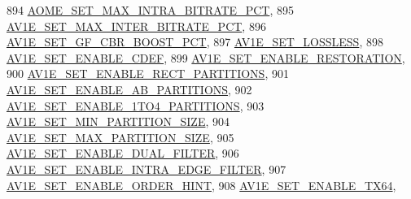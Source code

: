 \begin{DoxyCodeInclude}
{{{{{{{894                                         \hyperlink{group__aom__encoder_ggae78dde67a6d78f332e9bdba0dde42db5a9e1965ffa40d2d87556b65748c63adcc}{AOME\_SET\_MAX\_INTRA\_BITRATE\_PCT},
895                                         \hyperlink{group__aom__encoder_ggae78dde67a6d78f332e9bdba0dde42db5a54b7c950e51f39a3cb7344a2665b9929}{AV1E\_SET\_MAX\_INTER\_BITRATE\_PCT},
896                                         \hyperlink{group__aom__encoder_ggae78dde67a6d78f332e9bdba0dde42db5ade327180f01d27d22abd94c1f0a8bc9e}{AV1E\_SET\_GF\_CBR\_BOOST\_PCT},
897                                         \hyperlink{group__aom__encoder_ggae78dde67a6d78f332e9bdba0dde42db5afe875c6bb02f236be503c8c7b1f15875}{AV1E\_SET\_LOSSLESS},
898                                         \hyperlink{group__aom__encoder_ggae78dde67a6d78f332e9bdba0dde42db5a6879fe104e23de00f034ed11eb605031}{AV1E\_SET\_ENABLE\_CDEF},
899                                         \hyperlink{group__aom__encoder_ggae78dde67a6d78f332e9bdba0dde42db5a2ea70b4b379e701a4b3b7cc33eb05e65}{AV1E\_SET\_ENABLE\_RESTORATION},
900                                         \hyperlink{group__aom__encoder_ggae78dde67a6d78f332e9bdba0dde42db5af3db44e9871c69defc5ae2cc6c5e3ba0}{AV1E\_SET\_ENABLE\_RECT\_PARTITIONS},
901                                         \hyperlink{group__aom__encoder_ggae78dde67a6d78f332e9bdba0dde42db5a3f494511b35631e4d400f4df9a48c6dc}{AV1E\_SET\_ENABLE\_AB\_PARTITIONS},
902                                         \hyperlink{group__aom__encoder_ggae78dde67a6d78f332e9bdba0dde42db5ab2b627e9fad54fd84b18e73d8f6a8a51}{AV1E\_SET\_ENABLE\_1TO4\_PARTITIONS},
903                                         \hyperlink{group__aom__encoder_ggae78dde67a6d78f332e9bdba0dde42db5a4c1444fdafd3577606cef60afb33124c}{AV1E\_SET\_MIN\_PARTITION\_SIZE},
904                                         \hyperlink{group__aom__encoder_ggae78dde67a6d78f332e9bdba0dde42db5ab15141c333da6ddb99c5f2aeea934958}{AV1E\_SET\_MAX\_PARTITION\_SIZE},
905                                         \hyperlink{group__aom__encoder_ggae78dde67a6d78f332e9bdba0dde42db5a45867a101866f7ad1a67e7d72f84054a}{AV1E\_SET\_ENABLE\_DUAL\_FILTER},
906                                         \hyperlink{group__aom__encoder_ggae78dde67a6d78f332e9bdba0dde42db5a518cc32bbf169f8e9d4d71e7c1193748}{AV1E\_SET\_ENABLE\_INTRA\_EDGE\_FILTER},
907                                         \hyperlink{group__aom__encoder_ggae78dde67a6d78f332e9bdba0dde42db5ad0eaf349d653c8357acbba84ad95d5e6}{AV1E\_SET\_ENABLE\_ORDER\_HINT},
908                                         \hyperlink{group__aom__encoder_ggae78dde67a6d78f332e9bdba0dde42db5ab6d4110cee235e35452d0beb89a28604}{AV1E\_SET\_ENABLE\_TX64},
}}}}}}}
\end{DoxyCodeInclude}

